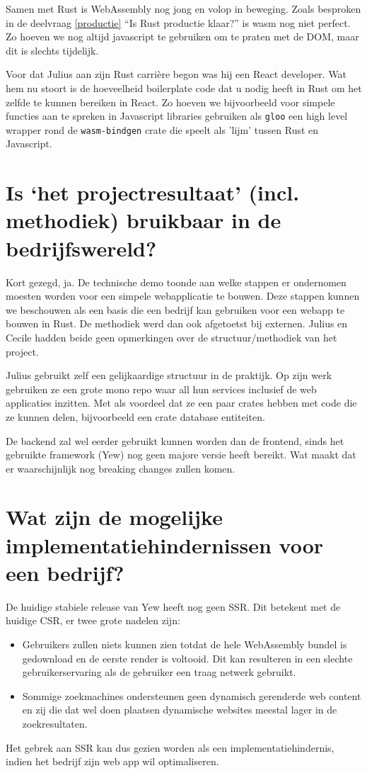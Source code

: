 Samen met Rust is WebAssembly nog jong en volop in beweging. Zoals besproken in de deelvraag
\ref{productie} \enquote{Is Rust productie klaar?} is wasm nog niet perfect. Zo hoeven we nog altijd
javascript te gebruiken om te praten met de DOM, maar dit is slechts tijdelijk.

Voor dat Julius aan zijn Rust carrière begon was hij een React developer. Wat hem nu stoort is de
hoeveelheid boilerplate code dat u nodig heeft in Rust om het zelfde te kunnen bereiken in React.
Zo hoeven we bijvoorbeeld voor simpele functies aan te spreken in Javascript libraries gebruiken als
\texttt{gloo} een high level wrapper rond de \texttt{wasm-bindgen} crate die
speelt als 'lijm' tussen Rust en Javascript.

\clearpage

\section{Is ‘het projectresultaat’ (incl. methodiek) bruikbaar in de bedrijfswereld?}

Kort gezegd, ja. De technische demo toonde aan welke stappen er ondernomen moesten worden voor een
simpele webapplicatie te bouwen. Deze stappen kunnen we beschouwen als een basis die een bedrijf kan
gebruiken voor een webapp te bouwen in Rust. De methodiek werd dan ook afgetoetst bij externen.
Julius en Cecile hadden beide geen opmerkingen over de structuur/methodiek van het project. 

Julius gebruikt zelf een gelijkaardige structuur in de praktijk. Op zijn werk gebruiken ze een grote
mono repo waar all hun services inclusief de web applicaties inzitten. Met als voordeel dat ze een
paar crates hebben met code die ze kunnen delen, bijvoorbeeld een crate database entiteiten.

De backend zal wel eerder gebruikt kunnen worden dan de frontend, sinds het gebruikte framework
(Yew) nog geen majore versie heeft bereikt. Wat maakt dat er waarschijnlijk nog breaking changes
zullen komen.


\section{Wat zijn de mogelijke implementatiehindernissen voor een bedrijf?}

De huidige stabiele release van Yew heeft nog geen SSR. Dit betekent met de huidige CSR, er twee
grote nadelen zijn:
\begin{itemize}
   \item Gebruikers zullen niets kunnen zien totdat de hele WebAssembly bundel is gedownload en de
   eerste render is voltooid. Dit kan resulteren in een slechte gebruikerservaring als de gebruiker
   een traag netwerk gebruikt.

  \item Sommige zoekmachines ondersteunen geen dynamisch gerenderde web content en zij die dat wel
  doen plaatsen dynamische websites meestal lager in de zoekresultaten.
\end{itemize}
Het gebrek aan SSR kan dus gezien worden als een implementatiehindernis, indien het bedrijf zijn web
app wil optimaliseren.

